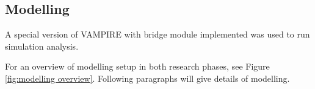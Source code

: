 






\subsection{Modelling}\label{sec:modelling329}
A special version of VAMPIRE with bridge module implemented was used to run simulation analysis. 

For an overview of modelling setup in both research phases, see Figure \ref{fig:modelling overview}. Following paragraphs will give details of modelling.


